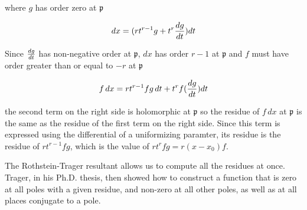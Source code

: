 where $g$ has order zero at $\mathfrak{p}$

$$dx = (rt^{r-1}g + t^r{{dg}\over{dt}})dt$$

Since ${dg}\over{dt}$ has non-negative order at $\mathfrak{p}$,
$dx$ has order $r-1$ at $\mathfrak{p}$ and $f$ must have order
greater than or equal to $-r$ at $\mathfrak{p}$

$$f\,dx = rt^{r-1}f g\, dt + t^rf({{dg}\over{dt}})dt$$

the second term on the right side is holomorphic at $\mathfrak{p}$ so
the residue of $f\,dx$ at $\mathfrak{p}$ is the same as the residue of
the first term on the right side.  Since this term is expressed using
the differential of a uniformizing paramter, its residue is the
residue of $rt^{r-1}fg$, which is the value of $rt^rfg = r(x-x_0)f$.

\endtheorem

\vfill\eject
{}

The Rothstein-Trager resultant allows us to compute all the residues
at once.  Trager, in his Ph.D. thesis, then showed how to construct a
function that is zero at all poles with a given residue, and non-zero
at all other poles, as well as at all places conjugate to a pole.
